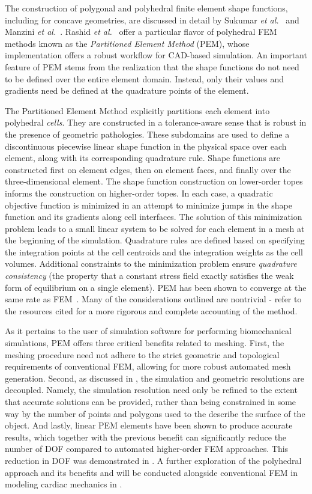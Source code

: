 The construction of polygonal and polyhedral finite element shape functions, including for concave geometries, are discussed in detail by Sukumar \textit{et al.}~\cite{sukumar_2006} and Manzini \textit{et al.}~\cite{manzini_2014}. Rashid \textit{et al.}~\cite{rashid_2012, rashid_2015} offer a particular flavor of polyhedral FEM methods known as the \textit{Partitioned Element Method} (PEM), whose implementation offers a robust workflow for CAD-based simulation. An important feature of PEM stems from the realization that the shape functions do not need to be defined over the entire element domain. Instead, only their values and gradients need be defined at the quadrature points of the element.

The Partitioned Element Method explicitly partitions each element into polyhedral \textit{cells}. They are constructed in a tolerance-aware sense that is robust in the presence of geometric pathologies. These subdomains are used to define a discontinuous piecewise linear shape function in the physical space over each element, along with its corresponding quadrature rule. Shape functions are constructed first on element edges, then on element faces, and finally over the three-dimensional element. The shape function construction on lower-order topes informs the construction on higher-order topes. In each case, a quadratic objective function is minimized in an attempt to minimize jumps in the shape function and its gradients along cell interfaces. The solution of this minimization problem leads to a small linear system to be solved for each element in a mesh at the beginning of the simulation. Quadrature rules are defined based on specifying the integration points at the cell centroids and the integration weights as the cell volumes. Additional constraints to the minimization problem ensure \textit{quadrature consistency} (the property that a constant stress field exactly satisfies the weak form of equilibrium on a single element). PEM has been shown to converge at the same rate as FEM~\cite{rashid_2012}. Many of the considerations outlined are nontrivial - refer to the resources cited for a more rigorous and complete accounting of the method.

As it pertains to the user of simulation software for performing biomechanical simulations, PEM offers three critical benefits related to meshing. First, the meshing procedure need not adhere to the strict geometric and topological requirements of conventional FEM, allowing for more robust automated mesh generation. Second, as discussed in , the simulation and geometric resolutions are decoupled. Namely, the simulation resolution need only be refined to the extent that accurate solutions can be provided, rather than being constrained in some way by the number of points and polygons used to the describe the surface of the object. And lastly, linear PEM elements have been shown to produce accurate results, which together with the previous benefit can significantly reduce the number of DOF compared to automated higher-order FEM approaches. This reduction in DOF was demonstrated in . A further exploration of the polyhedral approach and its benefits and will be conducted alongside conventional FEM in modeling cardiac mechanics in .

